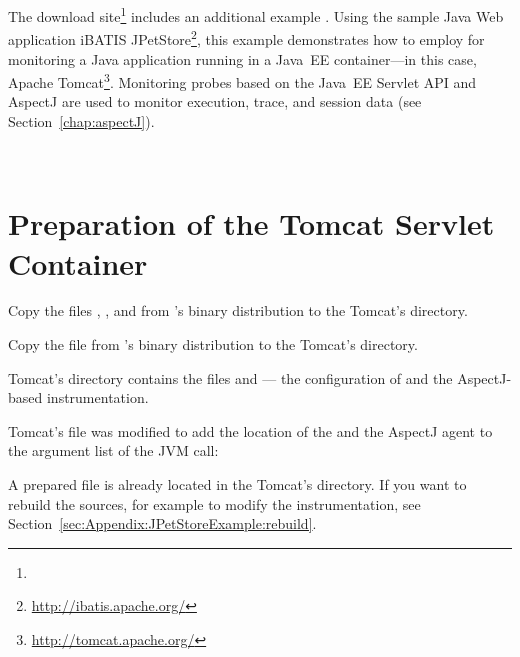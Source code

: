 The \Kieker{} download site\footnote{\KiekerDownloadURL{}} includes an additional %
example \file{\JavaEEServletExampleName}. Using the sample Java Web application %
iBATIS JPetStore\footnote{\url{http://ibatis.apache.org/}}, this example %
demonstrates how to employ \KiekerMonitoringPart{} for monitoring a Java application %
running in a Java~EE container---in this case, Apache Tomcat\footnote{\url{http://tomcat.apache.org/}}. %
Monitoring probes based on the Java~EE Servlet API %
and AspectJ are used to monitor execution, trace, and session data (see Section~\ref{chap:aspectJ}).

\


\section{Preparation of the Tomcat Servlet Container}

\begin{compactenum}
\item Copy the files \file{\mainJar}, \file{\commonsLoggingJar}, and \file{\aspectJWeaverJar} from %
\Kieker{}'s binary distribution to the Tomcat's  directory.
\item Copy the file \file{\servletWar} from \Kieker{}'s %
binary distribution to the Tomcat's  directory.
\item Tomcat's  directory contains the files  %
and  --- the configuration of \KiekerMonitoringPart{} and the %
AspectJ-based instrumentation. %
\item Tomcat's  file was modified to add the location %
of the  and the AspectJ agent to the argument %
list of the JVM call:
\end{compactenum}

\setPropertiesListing


\begin{compactenum}\setcounter{enumi}{4}
\item  A prepared  file is already located in the %
   Tomcat's  directory. If you want to rebuild the sources, %
   for example to modify the instrumentation, see Section~\ref{sec:Appendix:JPetStoreExample:rebuild}. 
\end{compactenum}


